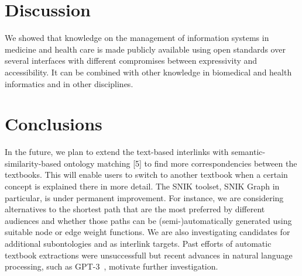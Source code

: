 \documentclass{IOS-Book-Article}     %
\newcommand{\citet}{\cite}%
\newcommand{\citep}{\cite}%
\begin{document}
\section{Discussion}
We showed that knowledge on the management of information systems in medicine and health care is made publicly available using open standards over several interfaces with different compromises between expressivity and accessibility.
It can be combined with other knowledge in biomedical and health informatics and in other disciplines.

\section{Conclusions}
In the future, we plan to extend the text-based interlinks with semantic-similarity-based ontology matching [5] to find more correspondencies between the textbooks.
This will enable users to switch to another textbook when a certain concept is explained there in more detail.
The SNIK toolset, SNIK Graph in particular, is under permanent improvement.
For instance, we are considering alternatives to the shortest path that are the most preferred by different audiences and whether those paths can be (semi-)automatically generated using suitable node or edge weight functions.
We are also investigating candidates for additional subontologies and as interlink targets.
Past efforts of automatic textbook extractions were unsuccessfull but recent advances in natural language processing, such as GPT-3~\citep{gpt3}, motivate further investigation.

%


\end{document}
